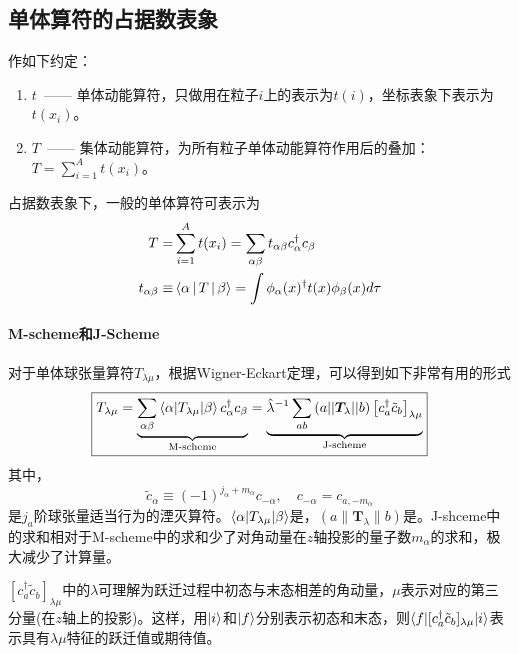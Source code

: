 \subsection{单体算符的占据数表象}
作如下约定：
\begin{enumerate}
    \item $t$\ —— 单体动能算符，只做用在粒子$i$上的表示为$t(i)$，坐标表象下表示为$t(x_i)$。
    \item $T$\ —— 集体动能算符，为所有粒子单体动能算符作用后的叠加：$T = \sum_{i = 1}^{A} t(x_i)$。
\end{enumerate}
占据数表象下，一般的单体算符可表示为
\begin{equation}
    \begin{aligned}
        T =& \sum_{i = 1}^{A} t(x_i) = \sum_{\alpha\beta} t_{\alpha\beta}c_{\alpha}^{\dagger}c_{\beta} \\
        t_{\alpha\beta} \equiv & \Braket{\alpha | T | \beta} = \int \phi_{\alpha}(x)^{\dagger} t(x) \phi_{\beta}(x) d\tau
    \end{aligned}
\end{equation}

\paragraph*{M-scheme和J-Scheme}
对于单体球张量算符$T_{\lambda\mu}$，根据Wigner-Eckart定理，可以得到如下非常有用的形式
\begin{equation}
    \boxed{
    T_{\lambda\mu} = 
    \underbrace{ \sum_{\alpha\beta}\braket{\alpha | T_{\lambda\mu} | \beta} c_{\alpha}^{\dagger} c_{\beta}}_{\text{M-scheme}}
    =\underbrace{\hat{\lambda}^{-1} \sum_{ab}\left(a || \bm{T}_{\lambda} || b\right) \left[c_{a}^{\dagger}\tilde{c}_{b} \right]_{\lambda\mu}}_{\text{J-scheme}}
    }
    \label{eq:sing-reduced-part-elem}
\end{equation}
其中，
\begin{equation}
    \tilde{c}_{\alpha} \equiv (-1)^{j_{\alpha} + m_{\alpha}} c_{-\alpha},
    \quad
    c_{-\alpha} = c_{a, -m_\alpha}
    \label{eq:sp.annihilation}
\end{equation}
是$j_{a}$阶球张量适当行为的湮灭算符。$\braket{\alpha | T_{\lambda\mu} | \beta}$是，$\left(a \| \bm{T}_{\lambda} \| b\right)$是。J-shceme中的求和相对于M-scheme中的求和少了对角动量在$z$轴投影的量子数$m_{\alpha}$的求和，极大减少了计算量。

$\left[c_{a}^{\dagger}\tilde{c}_{b}\right]_{\lambda\mu}$中的$\lambda$可理解为跃迁过程中初态与末态相差的角动量，$\mu$表示对应的第三分量(在$z$轴上的投影)。这样，用$\ket{i}$和$\ket{f}$分别表示初态和末态，则$\braket{f | [c_{a}^{\dagger}\tilde{c}_{b}]_{\lambda\mu} | i}$表示具有$\lambda\mu$特征的跃迁值或期待值。

